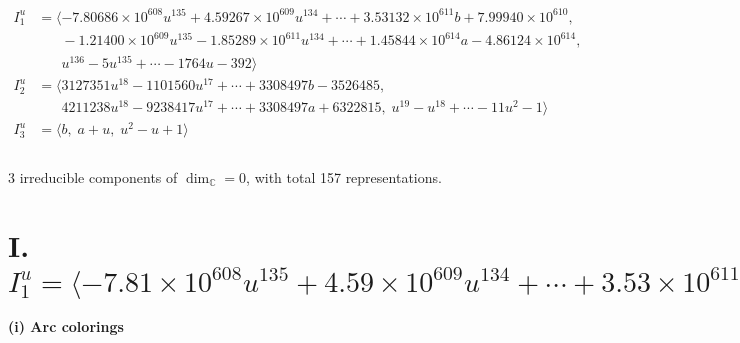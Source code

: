 \documentclass[1p]{elsarticle_modified}
\theoremstyle{definition}
\begin{document}
\begin{align*}
I^u_{1}&=\langle 
-7.80686\times10^{608} u^{135}+4.59267\times10^{609} u^{134}+\cdots+3.53132\times10^{611} b+7.99940\times10^{610},\\
\phantom{I^u_{1}}&\phantom{= \langle  }-1.21400\times10^{609} u^{135}-1.85289\times10^{611} u^{134}+\cdots+1.45844\times10^{614} a-4.86124\times10^{614},\\
\phantom{I^u_{1}}&\phantom{= \langle  }u^{136}-5 u^{135}+\cdots-1764 u-392\rangle \\
I^u_{2}&=\langle 
3127351 u^{18}-1101560 u^{17}+\cdots+3308497 b-3526485,\\
\phantom{I^u_{2}}&\phantom{= \langle  }4211238 u^{18}-9238417 u^{17}+\cdots+3308497 a+6322815,\;u^{19}- u^{18}+\cdots-11 u^2-1\rangle \\
I^u_{3}&=\langle 
b,\;a+u,\;u^2- u+1\rangle \\
\\
\end{align*}
\raggedright * 3 irreducible components of $\dim_{\mathbb{C}}=0$, with total 157 representations.\\
\newpage
\renewcommand{\arraystretch}{1}
\centering \section*{I. $I^u_{1}= \langle -7.81\times10^{608} u^{135}+4.59\times10^{609} u^{134}+\cdots+3.53\times10^{611} b+8.00\times10^{610},\;-1.21\times10^{609} u^{135}-1.85\times10^{611} u^{134}+\cdots+1.46\times10^{614} a-4.86\times10^{614},\;u^{136}-5 u^{135}+\cdots-1764 u-392 \rangle$}
\flushleft \textbf{(i) Arc colorings}\\
\end{document}
